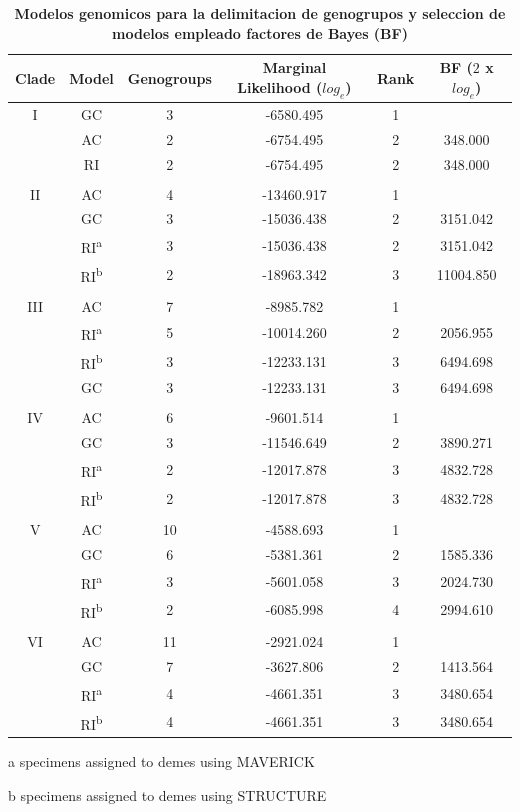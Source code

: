\documentclass[
  11pt,
]{article}
\begin{document}
\begin{table}[H]

\caption{\label{tab:table3}\textbf{Modelos genomicos para la delimitacion de genogrupos y seleccion de modelos empleado factores de Bayes (BF)}}
\centering
\fontsize{8}{10}\selectfont
\begin{threeparttable}
\begin{tabular}[t]{cccccc}
\toprule
Clade & Model & Genogroups & Marginal Likelihood ($log_e$) & Rank & BF ($2$ x $log_e$)\\
\midrule
I & GC & 3 & -6580.495 & 1 & \\
 & AC & 2 & -6754.495 & 2 & 348.000\\
 & RI & 2 & -6754.495 & 2 & 348.000\\
 &  &  &  &  & \\
II & AC & 4 & -13460.917 & 1 & \\
 & GC & 3 & -15036.438 & 2 & 3151.042\\
 & RI\textsuperscript{a} & 3 & -15036.438 & 2 & 3151.042\\
 & RI\textsuperscript{b} & 2 & -18963.342 & 3 & 11004.850\\
 &  &  &  &  & \\
III & AC & 7 & -8985.782 & 1 & \\
 & RI\textsuperscript{a} & 5 & -10014.260 & 2 & 2056.955\\
 & RI\textsuperscript{b} & 3 & -12233.131 & 3 & 6494.698\\
 & GC & 3 & -12233.131 & 3 & 6494.698\\
 &  &  &  &  & \\
IV & AC & 6 & -9601.514 & 1 & \\
 & GC & 3 & -11546.649 & 2 & 3890.271\\
 & RI\textsuperscript{a} & 2 & -12017.878 & 3 & 4832.728\\
 & RI\textsuperscript{b} & 2 & -12017.878 & 3 & 4832.728\\
 &  &  &  &  & \\
V & AC & 10 & -4588.693 & 1 & \\
 & GC & 6 & -5381.361 & 2 & 1585.336\\
 & RI\textsuperscript{a} & 3 & -5601.058 & 3 & 2024.730\\
 & RI\textsuperscript{b} & 2 & -6085.998 & 4 & 2994.610\\
 &  &  &  &  & \\
VI & AC & 11 & -2921.024 & 1 & \\
 & GC & 7 & -3627.806 & 2 & 1413.564\\
 & RI\textsuperscript{a} & 4 & -4661.351 & 3 & 3480.654\\
 & RI\textsuperscript{b} & 4 & -4661.351 & 3 & 3480.654\\
\bottomrule
\end{tabular}
\begin{tablenotes}
\item[a] specimens assigned to demes using MAVERICK
\item[b] specimens assigned to demes using STRUCTURE
\end{tablenotes}
\end{threeparttable}
\end{table}
\end{document}
